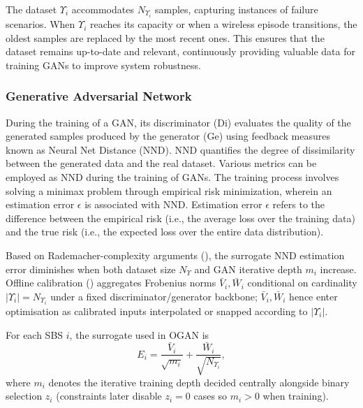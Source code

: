 \documentclass[letterpaper%
, twoside%
, 12pt%
,memoire%
, english%
,creativecommons,hyperref, withAlgo2e %
]{thETS}
\numberwithin{algorithm}{chapter}
\begin{document}
The dataset \( \Upsilon_i \) accommodates \( N_{\Upsilon_i} \) samples, capturing instances of failure scenarios. When \( \Upsilon_i \) reaches its capacity or when a wireless episode transitions, the oldest samples are replaced by the most recent ones. This ensures that the dataset remains up-to-date and relevant, continuously providing valuable data for training GANs to improve system robustness.









\subsubsection{Generative Adversarial Network} 

During the training of a GAN, its discriminator (Di) evaluates the quality of the generated samples produced by the generator (Ge) using feedback measures known as Neural Net Distance (NND). NND quantifies the degree of dissimilarity between the generated data and the real dataset. Various metrics can be employed as NND during the training of GANs. The training process involves solving a minimax problem through empirical risk minimization, wherein an estimation error \(\epsilon\) is associated with NND. Estimation error \(\epsilon\) refers to the difference between the empirical risk (i.e., the average loss over the training data) and the true risk (i.e., the expected loss over the entire data distribution).


Based on Rademacher-complexity arguments (\cite{ji2021understanding}), the surrogate NND estimation error diminishes when both dataset size \(N_{\Upsilon}\) and GAN iterative depth \(m_i\) increase. Offline calibration (\cite{zhou2020learning}) aggregates Frobenius norms \(\bar{V}_i,\bar{W}_i\) conditional on cardinality \(|\Upsilon_i|=N_{\Upsilon_i}\) under a fixed discriminator/generator backbone; \(\bar{V}_i,\bar{W}_i\) hence enter optimisation as calibrated inputs interpolated or snapped according to \(\lvert\Upsilon_i\rvert\).

For each SBS \(i\), the surrogate used in OGAN is
\begin{equation}\label{eq:gan_error}
E_i=\frac{\bar{V}_i}{\sqrt{m_i}}+\frac{\bar{W}_i}{\sqrt{N_{\Upsilon_i}}},
\end{equation}
where \(m_i\) denotes the iterative training depth decided centrally alongside binary selection \(z_i\) (constraints later disable \(z_i=0\) cases so \(m_i>0\) when training).
\end{document}
